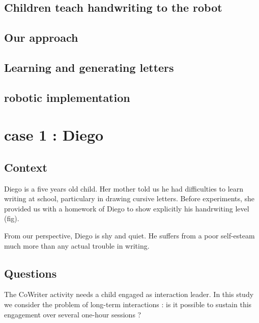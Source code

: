 \documentclass{sig-alternate}
\begin{document}
\subsection{Children teach handwriting to the robot}
\subsection{Our approach}

\subsection{Learning and generating letters}

\subsection{robotic implementation}

\section{case 1 : Diego}
\subsection{Context}
Diego is a five years old child. Her mother told us he had difficulties to learn
writing at school, particulary in drawing cursive letters. Before experiments,
she provided us with a homework of Diego to show explicitly his handrwiting
level (fig). 

From our perspective, Diego is shy and quiet. He suffers from a poor
self-esteam much more than any actual trouble in writing.

\subsection{Questions}
The CoWriter activity needs a child engaged as interaction leader. 
In this study we consider the problem of long-term interactions : is it possible to
sustain this engagement over several one-hour sessions ?


\end{document}
